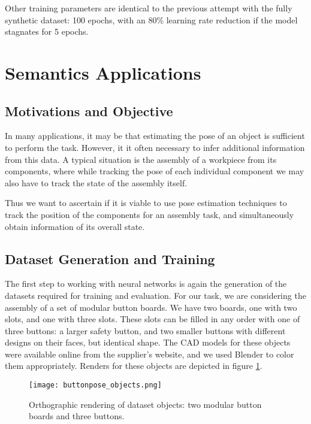 Other training parameters are identical to the previous attempt with the fully synthetic dataset: 100 epochs, with an 80\% learning rate reduction if the model stagnates for 5 epochs.

\section{Semantics Applications}

\subsection{Motivations and Objective}

In many applications, it may be that estimating the pose of an object is sufficient to perform the task. However, it it often necessary to infer additional information from this data. A typical situation is the assembly of a workpiece from its components, where while tracking the pose of each individual component we may also have to track the state of the assembly itself.

Thus we want to ascertain if it is viable to use pose estimation techniques to track the position of the components for an assembly task, and simultaneously obtain information of its overall state.

\subsection{Dataset Generation and Training}

The first step to working with neural networks is again the generation of the datasets required for training and evaluation. For our task, we are considering the assembly of a set of modular button boards. We have two boards, one with two slots, and one with three slots. These slots can be filled in any order with one of three buttons: a larger safety button, and two smaller buttons with different designs on their faces, but identical shape. The CAD models for these objects were available online from the supplier's website, and we used Blender to color them appropriately. Renders for these objects are depicted in figure \ref{fig:buttonpose_objects}.

\begin{figure}[ht]
    \texttt{[image: buttonpose\_objects.png]}
    \caption{Orthographic rendering of dataset objects: two modular button boards and three buttons.}
    \label{fig:buttonpose_objects}
\end{figure}

